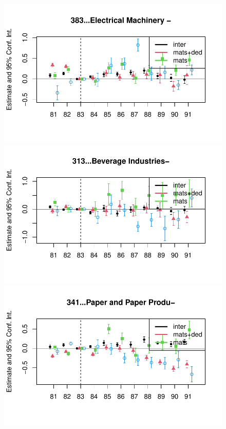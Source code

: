 \documentclass[
  12pt]{article}
\theoremstyle{definition}
\theoremstyle{remark}
\begin{document}
\begin{figure}
\begin{minipage}{\linewidth}
\includegraphics{Tax-Prod_files/figure-pdf/unnamed-chunk-11-6.pdf}

\includegraphics{Tax-Prod_files/figure-pdf/unnamed-chunk-11-7.pdf}

\includegraphics{Tax-Prod_files/figure-pdf/unnamed-chunk-11-8.pdf}


\end{minipage}
\end{figure}
\end{document}
